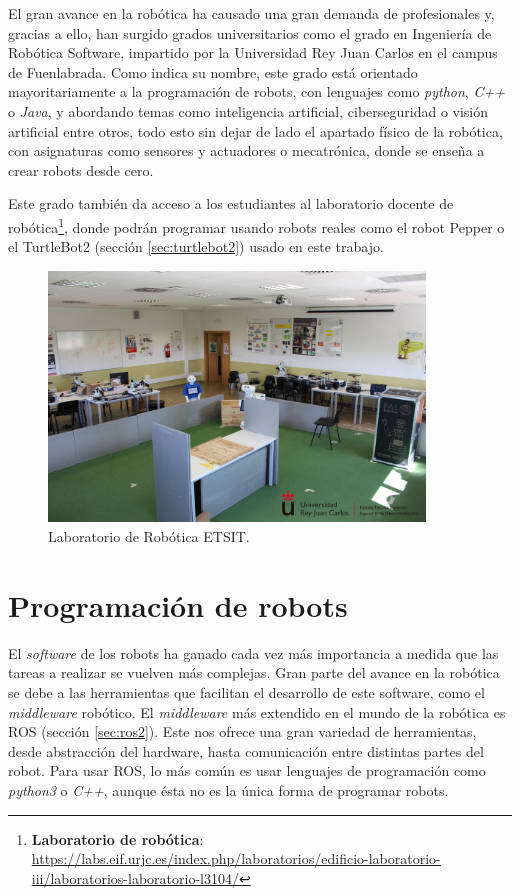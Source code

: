 El gran avance en la robótica ha causado una gran demanda de profesionales y, gracias a ello, han surgido grados universitarios como el grado en
Ingeniería de Robótica Software, impartido por la Universidad Rey Juan Carlos en el campus de Fuenlabrada.
Como indica su nombre, este grado está orientado mayoritariamente a la programación de robots, con lenguajes como \textit{python}, \textit{C++} o
\textit{Java}, y abordando temas como inteligencia artificial, ciberseguridad o visión artificial entre otros, todo esto sin dejar de lado
el apartado físico de la robótica, con asignaturas como sensores y actuadores o mecatrónica, donde se enseña a crear robots desde cero.

Este grado también da acceso a los estudiantes al laboratorio docente de
robótica\footnote{\textbf{Laboratorio de robótica}: \url{https://labs.eif.urjc.es/index.php/laboratorios/edificio-laboratorio-iii/laboratorios-laboratorio-l3104/}},
donde podrán programar usando robots reales como el robot Pepper o el TurtleBot2 (sección \ref{sec:turtlebot2}) usado en este trabajo.

\begin{figure} [H]
  \begin{center}
    \includegraphics[width=10cm]{figs/c1/rob_lab.jpg}
  \end{center}
  \caption[Laboratorio Robótica]{Laboratorio de Robótica ETSIT.}
  \label{fig:rob_lab}
\end{figure}

\section{Programación de robots}
\label{sec:prog_rob}

El \textit{software} de los robots ha ganado cada vez más importancia a medida que las tareas a realizar se vuelven más complejas.
Gran parte del avance en la robótica se debe a las herramientas que facilitan el desarrollo de este software, como el \textit{middleware} robótico.
El \textit{middleware} más extendido en el mundo de la robótica es ROS (sección \ref{sec:ros2}). Este nos ofrece una gran variedad de herramientas, desde 
abstracción del hardware, hasta comunicación entre distintas partes del robot. Para usar ROS, lo más común es usar lenguajes de programación como
\textit{python3} o \textit{C++}, aunque ésta no es la única forma de programar robots.

